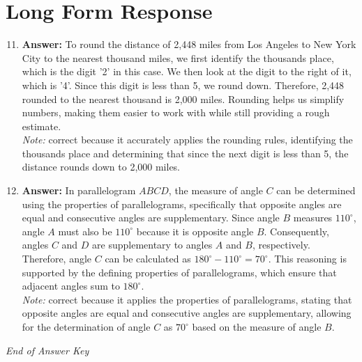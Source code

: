 \documentclass[12pt]{article}
\begin{document}
\section*{Long Form Response}
\begin{enumerate}[label=\arabic*.]
\setcounter{enumi}{10}
\item \textbf{Answer:} To round the distance of 2,448 miles from Los Angeles to New York City to the nearest thousand miles, we first identify the thousands place, which is the digit '2' in this case. We then look at the digit to the right of it, which is '4'. Since this digit is less than 5, we round down. Therefore, 2,448 rounded to the nearest thousand is 2,000 miles. Rounding helps us simplify numbers, making them easier to work with while still providing a rough estimate.
\\ \textit{Note:} correct because it accurately applies the rounding rules, identifying the thousands place and determining that since the next digit is less than 5, the distance rounds down to 2,000 miles.
\item \textbf{Answer:} In parallelogram \(ABCD\), the measure of angle \(C\) can be determined using the properties of parallelograms, specifically that opposite angles are equal and consecutive angles are supplementary. Since angle \(B\) measures \(110^\circ\), angle \(A\) must also be \(110^\circ\) because it is opposite angle \(B\). Consequently, angles \(C\) and \(D\) are supplementary to angles \(A\) and \(B\), respectively. Therefore, angle \(C\) can be calculated as \(180^\circ - 110^\circ = 70^\circ\). This reasoning is supported by the defining properties of parallelograms, which ensure that adjacent angles sum to \(180^\circ\).
\\ \textit{Note:} correct because it applies the properties of parallelograms, stating that opposite angles are equal and consecutive angles are supplementary, allowing for the determination of angle \(C\) as \(70^\circ\) based on the measure of angle \(B\).
\end{enumerate}

\vfill
\noindent\textit{End of Answer Key}
\end{document}
